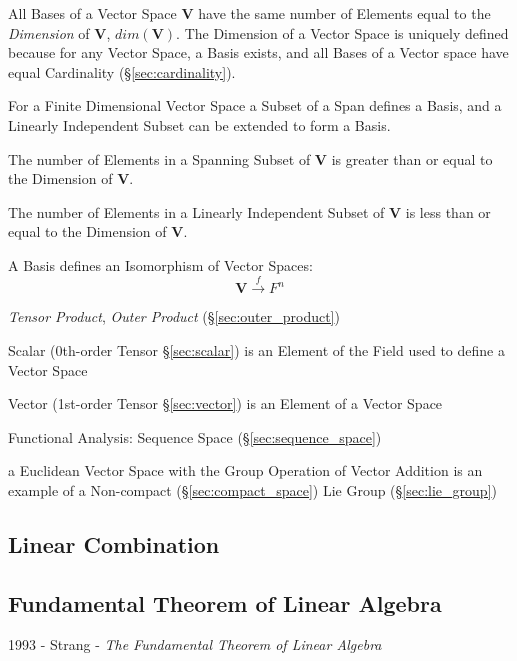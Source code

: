 All Bases of a Vector Space $\mathbf{V}$ have the same number of
Elements equal to the \emph{Dimension} of $\mathbf{V}$,
$dim(\mathbf{V})$. The Dimension of a Vector Space is uniquely defined
because for any Vector Space, a Basis exists, and all Bases of a
Vector space have equal Cardinality (\S\ref{sec:cardinality}).

For a Finite Dimensional Vector Space a Subset of a Span defines a
Basis, and a Linearly Independent Subset can be extended to form a
Basis.

The number of Elements in a Spanning Subset of $\mathbf{V}$ is greater
than or equal to the Dimension of $\mathbf{V}$.

The number of Elements in a Linearly Independent Subset of
$\mathbf{V}$ is less than or equal to the Dimension of $\mathbf{V}$.

A Basis defines an Isomorphism of Vector Spaces:
\[
    \mathbf{V} \xrightarrow{f} F^n
\]

\emph{Tensor Product}, \emph{Outer Product} (\S\ref{sec:outer_product})

Scalar (0th-order Tensor \S\ref{sec:scalar}) is an Element of the
Field used to define a Vector Space

Vector (1st-order Tensor \S\ref{sec:vector}) is an Element of a Vector
Space

Functional Analysis: Sequence Space (\S\ref{sec:sequence_space})

a Euclidean Vector Space with the Group Operation of Vector Addition is an
example of a Non-compact (\S\ref{sec:compact_space}) Lie Group
(\S\ref{sec:lie_group})



\subsection{Linear Combination}\label{sec:linear_combination}

\subsection{Fundamental Theorem of Linear Algebra}
\label{sec:fundamental_linear_algebra_theorem}

1993 - Strang - \emph{The Fundamental Theorem of Linear Algebra}

